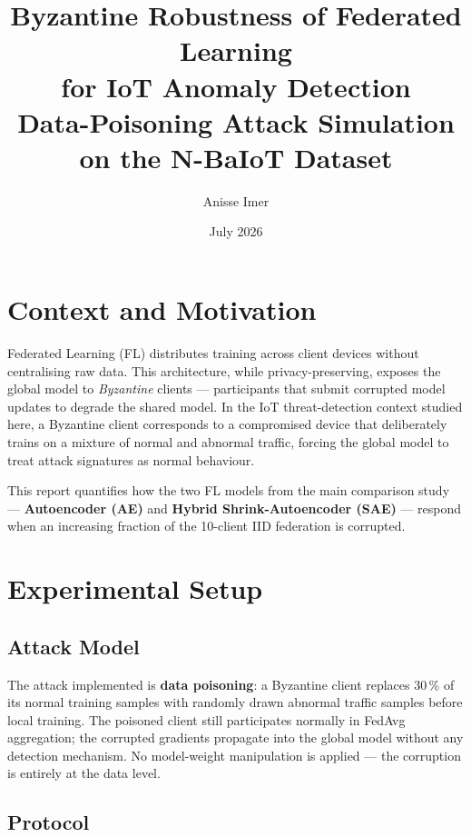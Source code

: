 \documentclass[11pt,a4paper]{article}
\title{\textbf{Byzantine Robustness of Federated Learning\\for IoT Anomaly Detection}\\[0.4em]
\large Data-Poisoning Attack Simulation on the N-BaIoT Dataset}
\author{Anisse Imer}
\date{July 2026}
\begin{document}
\maketitle
\tableofcontents
\newpage

\section{Context and Motivation}

Federated Learning (FL) distributes training across client devices without centralising raw data.
This architecture, while privacy-preserving, exposes the global model to \emph{Byzantine}
clients --- participants that submit corrupted model updates to degrade the shared model.
In the IoT threat-detection context studied here, a Byzantine client corresponds to a
compromised device that deliberately trains on a mixture of normal and abnormal traffic,
forcing the global model to treat attack signatures as normal behaviour.

This report quantifies how the two FL models from the main comparison study ---
\textbf{Autoencoder (AE)} and \textbf{Hybrid Shrink-Autoencoder (SAE)} --- respond
when an increasing fraction of the 10-client IID federation is corrupted.

\section{Experimental Setup}

\subsection{Attack Model}

The attack implemented is \textbf{data poisoning}: a Byzantine client replaces 30\,\% of
its normal training samples with randomly drawn abnormal traffic samples before local
training.
The poisoned client still participates normally in FedAvg aggregation; the corrupted
gradients propagate into the global model without any detection mechanism.
No model-weight manipulation is applied --- the corruption is entirely at the data level.

\subsection{Protocol}
\end{document}
